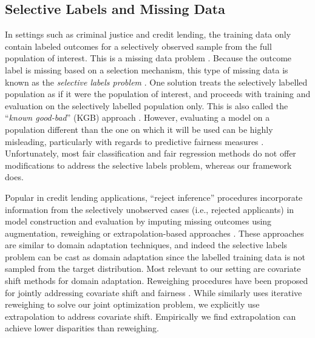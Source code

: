 \documentclass{article}
\begin{document}
\subsection{Selective Labels and Missing Data}
In settings such as criminal justice and credit lending, the training data only contain labeled outcomes for a selectively observed sample from the full population of interest. This is a missing data problem \cite{little2019statistical}. Because the outcome label is missing based on a selection mechanism, this type of missing data is known as the \emph{selective labels problem} \cite{lakkaraju2017selective, kleinberg2018human}. One solution treats the selectively labelled population as if it were the population of interest, and proceeds with training and evaluation on the selectively labelled population only. This is also called the ``\emph{known good-bad}'' (KGB) approach \cite{ zeng2014rule, nguyen2016reject}. However, evaluating a model on a population different than the one on which it will be used can be highly misleading, particularly with regards to predictive fairness measures \cite{kallus2018residual, CostonEtAl(20)}. Unfortunately, most fair classification and fair regression methods do not offer modifications to address the selective labels problem, whereas our framework does.

Popular in credit lending applications, ``reject inference'' procedures incorporate information from the selectively unobserved cases (i.e., rejected applicants) in model construction and evaluation by imputing missing outcomes using augmentation, reweighing or extrapolation-based approaches \cite{LiEtAl(20), mancisidor2020deep}. 
These approaches are similar to domain adaptation techniques, and indeed 
the selective labels problem can be cast as domain adaptation since the labelled training data is not sampled from the target distribution. Most relevant to our setting are covariate shift methods for domain adaptation. Reweighing procedures have been proposed for jointly addressing covariate shift and fairness \cite{coston2019fair, SinghViolations}. While \fairs similarly uses iterative reweighing to solve our joint optimization problem, we explicitly use extrapolation to address covariate shift.
Empirically we find extrapolation can achieve lower disparities than reweighing.
\end{document}
